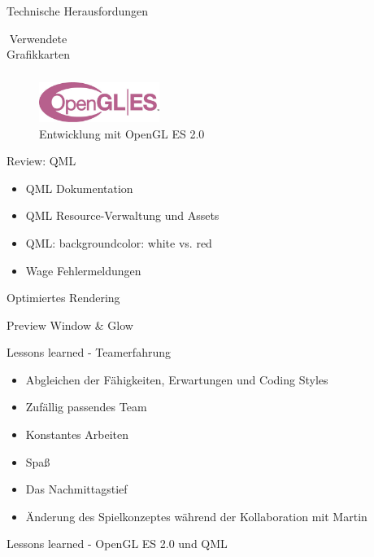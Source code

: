 \begin{frame}{Technische Herausfordungen}
{\begin{table}[h]
\begin{tabular}{c|c|c}
	\end{tabular}
	\caption{Verwendete Grafikkarten}
	\end{table}
}
\begin{figure}
		\centering
		\includegraphics[width=0.35\textwidth, height=0.7\textheight, keepaspectratio]{images/opengl_es_logo}
		\caption{Entwicklung mit OpenGL ES 2.0}
	\end{figure}
\end{frame}


\begin{frame}{Review: QML}
	\begin{itemize}
	\item QML Dokumentation
	\item QML Resource-Verwaltung und Assets
	\item QML: backgroundcolor: white vs. red
	\item Wage Fehlermeldungen
	\end{itemize}
\end{frame}

\begin{frame}{Optimiertes Rendering}

\end{frame}

\begin{frame}{Preview Window \& Glow}

\end{frame}

\begin{frame}{Lessons learned - Teamerfahrung}
	\begin{itemize}
		\item Abgleichen der Fähigkeiten, Erwartungen und Coding Styles
		\item Zufällig passendes Team
		\item Konstantes Arbeiten
		\item Spaß
	\end{itemize}
	\vfill
	\begin{itemize}
		\item Das Nachmittagstief
		\item Änderung des Spielkonzeptes während der Kollaboration mit Martin
	\end{itemize}
\end{frame}

\begin{frame}{Lessons learned - OpenGL ES 2.0 und QML}

\end{frame}

%

